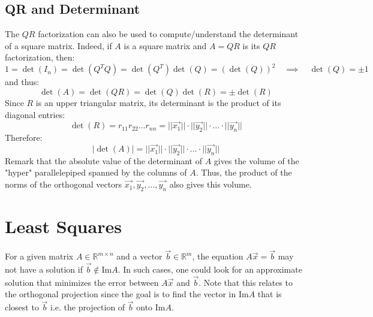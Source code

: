 \subsection{QR and Determinant}
The $QR$ factorization can also be used to compute/understand the determinant of a square matrix. Indeed, if $A$ is a square matrix and $A = QR$ is its $QR$ factorization, then:
\[
    1 = \det(I_n) = \det(Q^T Q) = \det(Q^T) \det(Q) = (\det(Q))^2 \quad \implies \quad \det(Q) = \pm 1
\]
and thus:
\[
    \det(A) = \det(QR) = \det(Q) \det(R) = \pm \det(R)
\]
Since $R$ is an upper triangular matrix, its determinant is the product of its diagonal entries:
\[
    \det(R) = r_{11} r_{22} \ldots r_{nn} = ||\vec{x_1}|| \cdot ||\vec{y_2}|| \cdot \ldots \cdot ||\vec{y_n}||
\]
Therefore:
\[
    |\det(A)| = ||\vec{x_1}|| \cdot ||\vec{y_2}|| \cdot \ldots \cdot ||\vec{y_n}||
\]
Remark that the absolute value of the determinant of $A$ gives the volume of the "hyper" parallelepiped spanned by the columns of $A$. Thus, the product of the norms of the orthogonal vectors $\vec{x_1}, \vec{y_2}, \ldots, \vec{y_n}$ also gives this volume.

\section{Least Squares}
For a given matrix $A \in \mathbb{R}^{m \times n}$ and a vector $\vec{b} \in \mathbb{R}^m$, the equation $A \vec{x} = \vec{b}$ may not have a solution if $\vec{b} \notin \text{Im} A$. In such cases, one could look for an approximate solution that minimizes the error between $A \vec{x}$ and $\vec{b}$. Note that this relates to the orthogonal projection since the goal is to find the vector in $\text{Im} A$ that is closest to $\vec{b}$ i.e. the projection of $\vec{b}$ onto $\text{Im} A$.

